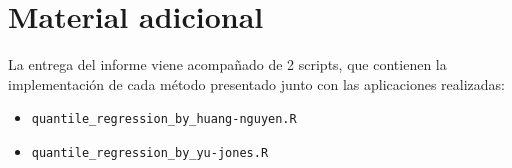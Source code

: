 \documentclass[
  12pt,
]{article}
\begin{document}
\hypertarget{material-adicional}{%
\section*{Material adicional}\label{material-adicional}}

La entrega del informe viene acompañado de 2 scripts, que contienen la
implementación de cada método presentado junto con las aplicaciones
realizadas:

\begin{itemize}
\item
  \texttt{quantile\_regression\_by\_huang-nguyen.R}
\item
  \texttt{quantile\_regression\_by\_yu-jones.R}
\end{itemize}
\end{document}
